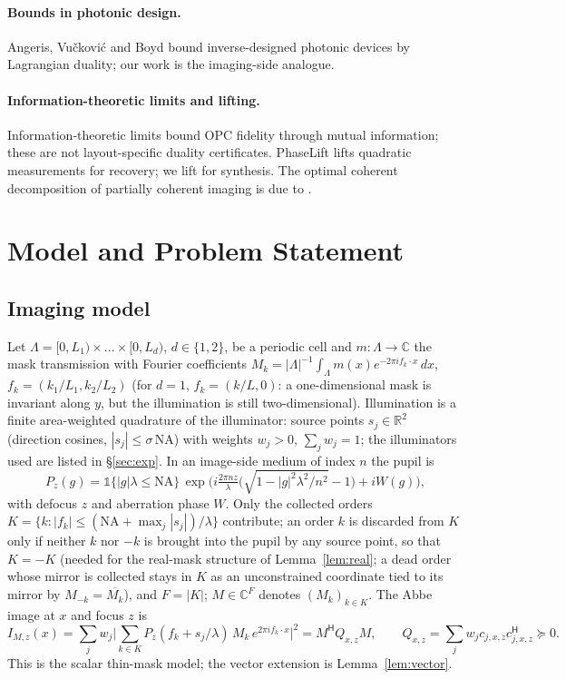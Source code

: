 \documentclass[11pt,a4paper]{article}
\theoremstyle{remark}\newtheorem*{remark}{Remark}
\newcommand{\R}{\mathbb{R}}\newcommand{\C}{\mathbb{C}}\newcommand{\PSD}{\succeq 0}
\newcommand{\I}{I}\newcommand{\rhostar}{\rho^{\star}}\newcommand{\NA}{\mathrm{NA}}\newcommand{\EL}{\mathrm{EL}}
\begin{document}
\paragraph{Bounds in photonic design.} Angeris, Vu\v{c}kovi\'c and Boyd \cite{angeris2019,angeris2021} bound inverse-designed photonic devices by Lagrangian duality; our work is the imaging-side analogue.
\paragraph{Information-theoretic limits and lifting.} Information-theoretic limits \cite{ma2017,wang2018} bound OPC fidelity through mutual information; these are not layout-specific duality certificates. PhaseLift \cite{candes2013} lifts quadratic measurements for recovery; we lift for synthesis. The optimal coherent decomposition of partially coherent imaging is due to \cite{pati1994}.

\section{Model and Problem Statement}\label{sec:model}
\subsection{Imaging model}
Let $\Lambda=[0,L_1)\times\dots\times[0,L_d)$, $d\in\{1,2\}$, be a periodic cell and $m:\Lambda\to\C$ the mask transmission with Fourier coefficients $M_k=|\Lambda|^{-1}\int_\Lambda m(x)e^{-2\pi i f_k\cdot x}\,dx$, $f_k=(k_1/L_1,k_2/L_2)$ (for $d=1$, $f_k=(k/L,0)$: a one-dimensional mask is invariant along $y$, but the illumination is still two-dimensional). Illumination is a finite area-weighted quadrature of the illuminator: source points $s_j\in\R^2$ (direction cosines, $|s_j|\le\sigma\,\NA$) with weights $w_j>0$, $\sum_j w_j=1$; the illuminators used are listed in \S\ref{sec:exp}. In an image-side medium of index $n$ the pupil is
\begin{equation}\label{eq:pupil}
P_z(g)=\mathbb{1}\{|g|\lambda\le\NA\}\,\exp\!\Big(i\tfrac{2\pi n z}{\lambda}\big(\sqrt{1-|g|^2\lambda^2/n^2}-1\big)+iW(g)\Big),
\end{equation}
with defocus $z$ and aberration phase $W$. Only the collected orders $K=\{k:|f_k|\le(\NA+\max_j|s_j|)/\lambda\}$ contribute; an order $k$ is discarded from $K$ only if neither $k$ nor $-k$ is brought into the pupil by any source point, so that $K=-K$ (needed for the real-mask structure of Lemma~\ref{lem:real}; a dead order whose mirror is collected stays in $K$ as an unconstrained coordinate tied to its mirror by $M_{-k}=\overline{M_k}$), and $F=|K|$; $M\in\C^F$ denotes $(M_k)_{k\in K}$. The Abbe image at $x$ and focus $z$ is
\begin{equation}\label{eq:image}
\I_{M,z}(x)=\sum_{j} w_j\Big|\sum_{k\in K}P_z(f_k+s_j/\lambda)\,M_k\,e^{2\pi i f_k\cdot x}\Big|^2 = M^{\mathsf H}Q_{x,z}M,\qquad Q_{x,z}=\sum_j w_j c_{j,x,z}c_{j,x,z}^{\mathsf H}\PSD .
\end{equation}
This is the scalar thin-mask model; the vector extension is Lemma~\ref{lem:vector}.
\end{document}
